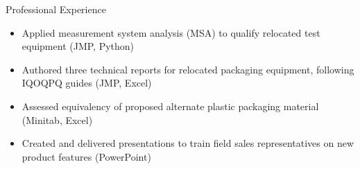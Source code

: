 \documentclass{article}
\begin{document}
\begin{experienceSection}{Professional Experience}
    \experienceItem[
        company={Stryker Solutions},
        location={Phoenix, AZ},
        position={Research \& Dev Development Intern},
        duration={May 2019 -- Aug 2019}
    ]
    \begin{itemize}
        \itemsep -6pt {}
        \item Applied measurement system analysis (MSA) to qualify relocated test equipment (JMP, Python)
        \item Authored three technical reports for relocated packaging equipment, following IQOQPQ guides (JMP, Excel)
    \end{itemize}

    \experienceItem[
        company={Med Apps},
        location={Scottsdale, AZ},
        position={Quality Engineering Intern},
        duration={May 2018 -- Aug 2018}
    ]
    \begin{itemize}
        \itemsep -6pt {}
        \item Assessed equivalency of proposed alternate plastic packaging material (Minitab, Excel)
        \item Created and delivered presentations to train field sales representatives on new product features (PowerPoint)
    \end{itemize}

\end{experienceSection}
\end{document}
